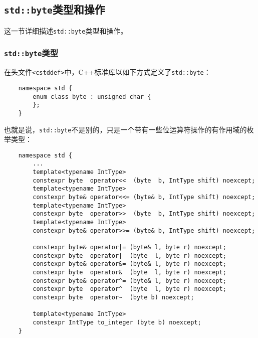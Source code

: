 \subsection{\texttt{std::byte}类型和操作}
这一节详细描述\texttt{std::byte}类型和操作。

\subsubsection{\texttt{std::byte}类型}
在头文件\texttt{<cstddef>}中，C++标准库以如下方式定义了\texttt{std::byte}：
\begin{lstlisting}
    namespace std {
        enum class byte : unsigned char {
        };
    }
\end{lstlisting}
也就是说，\texttt{std::byte}不是别的，只是一个带有一些位运算符操作的有作用域的枚举类型：
\begin{lstlisting}
    namespace std {
        ...
        template<typename IntType>
        constexpr byte  operator<<  (byte  b, IntType shift) noexcept;
        template<typename IntType>
        constexpr byte& operator<<= (byte& b, IntType shift) noexcept;
        template<typename IntType>
        constexpr byte  operator>>  (byte  b, IntType shift) noexcept;
        template<typename IntType>
        constexpr byte& operator>>= (byte& b, IntType shift) noexcept;

        constexpr byte& operator|= (byte& l, byte r) noexcept;
        constexpr byte  operator|  (byte  l, byte r) noexcept;
        constexpr byte& operator&= (byte& l, byte r) noexcept;
        constexpr byte  operator&  (byte  l, byte r) noexcept;
        constexpr byte& operator^= (byte& l, byte r) noexcept;
        constexpr byte  operator^  (byte  l, byte r) noexcept;
        constexpr byte  operator~  (byte b) noexcept;

        template<typename IntType>
        constexpr IntType to_integer (byte b) noexcept;
    }
\end{lstlisting}

